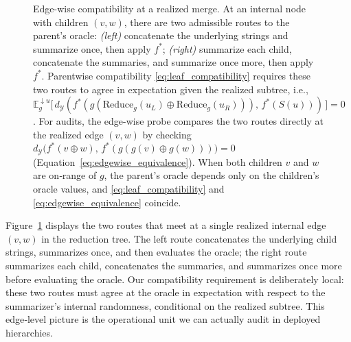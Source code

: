 \documentclass[11pt]{article}
\newcommand{\Y}{\mathcal{Y}}               %
\newcommand{\fstar}{f^*}               %
\newcommand{\E}{\mathbb{E}}
\newcommand{\concat}{\oplus}                    %
\newcommand{\metric}{d_{\Y}}
\newcommand{\reduce}{\text{Reduce}}
\newcommand{\reduceg}{\reduce_g}
\newcommand{\Eg}{\E_g}     %
\begin{document}
\begin{figure}
    \centering
    \caption{Edge-wise compatibility at a realized merge. 
At an internal node with children $(v,w)$, there are two admissible routes to the parent's oracle: 
\emph{(left)} concatenate the underlying strings and summarize once, then apply $\fstar$; 
\emph{(right)} summarize each child, concatenate the summaries, and summarize once more, then apply $\fstar$. 
Parentwise compatibility \ref{eq:leaf_compatibility} requires these two routes to agree in expectation given the realized subtree, i.e., 
$\Eg^{\downarrow u}\big[\,\metric(\fstar(g(\reduceg(u_L)\concat \reduceg(u_R))),\,\fstar(S(u)) )\,\big]=0$. 
For audits, the edge-wise probe compares the two routes directly at the realized edge $(v,w)$ by checking 
$\metric\!\big(\fstar(v\concat w),\,\fstar(g(g(v)\concat g(w)))\big)=0$ (Equation~\ref{eq:edgewise_equivalence}). When both children $v$ and $w$ are on‑range of $g$, the parent’s oracle depends only on the children’s oracle values, and \ref{eq:leaf_compatibility} and \ref{eq:edgewise_equivalence} coincide.}
    \label{fig:local_compatibility}
\end{figure}


Figure~\ref{fig:local_compatibility} displays the two routes that meet at a single realized internal edge $(v,w)$ in the reduction tree. The left route concatenates the underlying child strings, summarizes once, and then evaluates the oracle; the right route summarizes each child, concatenates the summaries, and summarizes once more before evaluating the oracle. Our compatibility requirement is deliberately local: these two routes must agree at the oracle in expectation with respect to the summarizer's internal randomness, conditional on the realized subtree. This edge‑level picture is the operational unit we can actually audit in deployed hierarchies.
\end{document}
